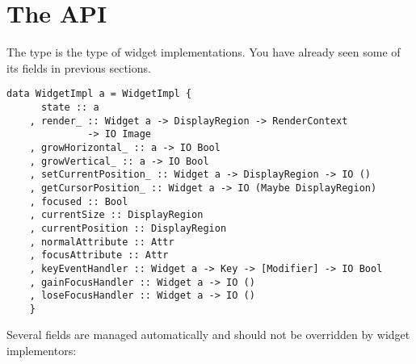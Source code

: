 \section{The  API}

The  type is the type of widget implementations.  You
have already seen some of its fields in previous sections.

\begin{verbatim}
data WidgetImpl a = WidgetImpl {
      state :: a
    , render_ :: Widget a -> DisplayRegion -> RenderContext
              -> IO Image
    , growHorizontal_ :: a -> IO Bool
    , growVertical_ :: a -> IO Bool
    , setCurrentPosition_ :: Widget a -> DisplayRegion -> IO ()
    , getCursorPosition_ :: Widget a -> IO (Maybe DisplayRegion)
    , focused :: Bool
    , currentSize :: DisplayRegion
    , currentPosition :: DisplayRegion
    , normalAttribute :: Attr
    , focusAttribute :: Attr
    , keyEventHandler :: Widget a -> Key -> [Modifier] -> IO Bool
    , gainFocusHandler :: Widget a -> IO ()
    , loseFocusHandler :: Widget a -> IO ()
    }
\end{verbatim}

Several fields are managed automatically and should not be overridden
by widget implementors:

